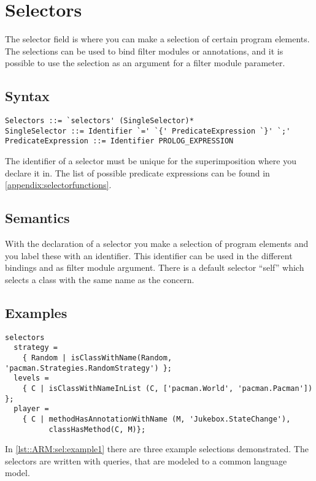\chapter{Selectors} \label{chapter:selector}
The selector field is where you can make a selection of certain program elements. The selections
can be used to bind filter modules or annotations, and it is possible to use the selection as an argument for a filter module parameter.

\section*{Syntax} %
\begin{lstlisting}[caption = {Selector syntax}, label = lst::ARM:sel:syntax,
style = listing, language = ebnf, float = tpb]
Selectors ::= `selectors' (SingleSelector)*
SingleSelector ::= Identifier `=' `{' PredicateExpression `}' `;'
PredicateExpression ::= Identifier PROLOG_EXPRESSION
\end{lstlisting}
The identifier of a selector must be unique for the superimposition where you declare it in. The list of possible
predicate expressions can be found in \autoref{appendix:selectorfunctions}.

\section*{Semantics}
With the declaration of a selector you make a selection of program elements and you label these with an identifier.
This identifier can be used in the different bindings and as filter module argument. There is a default selector
``self'' which selects a class with the same name as the concern.

\section*{Examples}
\begin{lstlisting}[caption={Some selector examples}, label = lst::ARM:sel:example1,
style=listing, language =ComposeStar, float = tpb]
selectors
  strategy = 
    { Random | isClassWithName(Random, 'pacman.Strategies.RandomStrategy') };
  levels = 
    { C | isClassWithNameInList (C, ['pacman.World', 'pacman.Pacman']) };
  player = 
    { C | methodHasAnnotationWithName (M, 'Jukebox.StateChange'),
          classHasMethod(C, M)};
\end{lstlisting}
In \autoref{lst::ARM:sel:example1} there are three example selections demonstrated. The selectors are written with
queries, that are modeled to a common language model.

